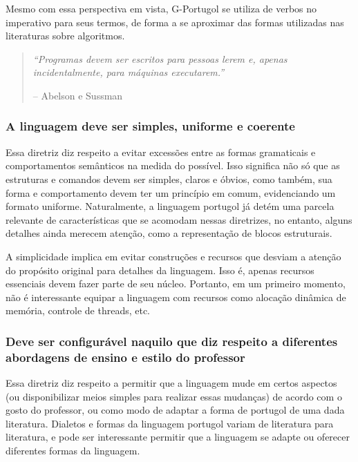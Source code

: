 \documentclass[a4paper,11pt]{report}
\begin{document}
Mesmo com essa perspectiva em vista, G-Portugol se utiliza de verbos no
imperativo para seus termos, de forma a se aproximar das formas utilizadas nas
literaturas sobre algoritmos.

\begin{quotation}
  \textit{``Programas devem ser escritos para pessoas lerem e, apenas
  incidentalmente, para máquinas executarem.''}
   \begin{flushright}
  -- Abelson e Sussman
  \end{flushright}
\end{quotation}

\subsubsection{A linguagem deve ser simples, uniforme e coerente}

Essa diretriz diz respeito a evitar excessões entre as formas gramaticais e
comportamentos semânticos na medida do possível. Isso significa não só que as
estruturas e comandos devem ser simples, claros e óbvios, como também, sua forma
e comportamento devem ter um princípio em comum, evidenciando um formato
uniforme. Naturalmente, a linguagem portugol já detém uma parcela relevante de
características que se acomodam nessas diretrizes, no entanto, alguns detalhes
ainda merecem atenção, como a representação de blocos estruturais.

A simplicidade implica em evitar construções e recursos que desviam a atenção do
propósito original para detalhes da linguagem. Isso é, apenas recursos
essenciais devem fazer parte de seu núcleo. Portanto, em um primeiro momento,
não é interessante equipar a linguagem com recursos como alocação dinâmica de
memória, controle de threads, etc.

\subsubsection{Deve ser configurável naquilo que diz respeito a
diferentes abordagens de ensino e estilo do professor}

Essa diretriz diz respeito a permitir que a linguagem mude em certos aspectos
(ou disponibilizar meios simples para realizar essas mudanças) de acordo com o
gosto do professor, ou como modo de adaptar a forma de portugol de uma dada
literatura. Dialetos e formas da linguagem portugol variam de literatura para
literatura, e pode ser interessante permitir que a linguagem se adapte ou
oferecer diferentes formas da linguagem.
\end{document}
